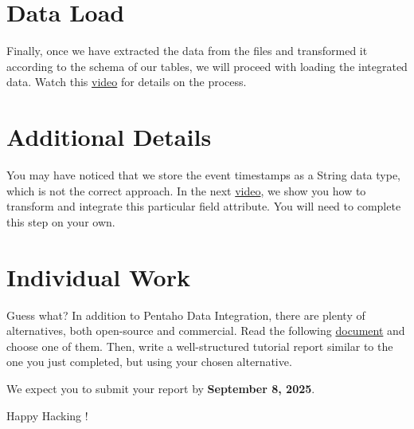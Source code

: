\documentclass{article}
\begin{document}
\section{Data Load}
Finally, once we have extracted the data from the files and transformed it according to the schema of our tables, we will proceed with loading the integrated data. Watch this \href{https://drive.google.com/file/d/12NCKeYGPp_vZtaxFOrxBwJY1tjRE9eo7/view?usp=drive_link}{video} for details on the process.

\section{Additional Details}
You may have noticed that we store the event timestamps as a String data type, which is not the correct approach. In the next \href{https://drive.google.com/file/d/11d7nMsZtGBEPh7BTEz2RDwHsYFVBr7r4/view?usp=drive_link}{video}, we show you how to transform and integrate this particular field attribute. You will need to complete this step on your own.

\section{Individual Work}
Guess what? In addition to Pentaho Data Integration, there are plenty of alternatives, both open-source and commercial. Read the following \href{https://drive.google.com/file/d/1azz_AAFfquty6bu2YkU9ZqFeTXC2YU0X/view?usp=sharing}{document} and choose one of them. Then, write a well-structured tutorial report similar to the one you just completed, but using your chosen alternative.

We expect you to submit your report by \textbf{September 8, 2025}.

\vspace{5mm}
Happy Hacking !
\end{document}
